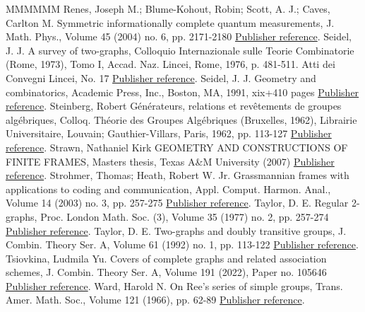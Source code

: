 \begin{thebibliography}{MMMMMM}
 Renes, Joseph M.; Blume-Kohout, Robin; Scott, A. J.; Caves, Carlton M. Symmetric informationally complete quantum measurements, J. Math. Phys., Volume 45 (2004) no. 6, pp. 2171-2180 \href{https://alco.centre-mersenne.org/articles/10.5802/alco.324/#RenesBlumeKohoutScottCaves:04}{Publisher reference}.
 Seidel, J. J. A survey of two-graphs, Colloquio Internazionale sulle Teorie Combinatorie (Rome, 1973), Tomo I, Accad. Naz. Lincei, Rome, 1976, p. 481-511. Atti dei Convegni Lincei, No. 17 \href{https://alco.centre-mersenne.org/articles/10.5802/alco.324/#Seidel:76}{Publisher reference}.
 Seidel, J. J. Geometry and combinatorics, Academic Press, Inc., Boston, MA, 1991, xix+410 pages \href{https://alco.centre-mersenne.org/articles/10.5802/alco.324/#Seidel:91}{Publisher reference}.
 Steinberg, Robert Générateurs, relations et revêtements de groupes algébriques, Colloq. Théorie des Groupes Algébriques (Bruxelles, 1962), Librairie Universitaire, Louvain; Gauthier-Villars, Paris, 1962, pp. 113-127 \href{https://alco.centre-mersenne.org/articles/10.5802/alco.324/#Steinberg:62}{Publisher reference}.
 Strawn, Nathaniel Kirk GEOMETRY AND CONSTRUCTIONS OF FINITE FRAMES, Masters thesis, Texas A\&M University (2007) \href{https://alco.centre-mersenne.org/articles/10.5802/alco.324/#Strawn:07}{Publisher reference}.
 Strohmer, Thomas; Heath, Robert W. Jr. Grassmannian frames with applications to coding and communication, Appl. Comput. Harmon. Anal., Volume 14 (2003) no. 3, pp. 257-275 \href{https://alco.centre-mersenne.org/articles/10.5802/alco.324/#StrohmerHeath:03}{Publisher reference}.
 Taylor, D. E. Regular 2-graphs, Proc. London Math. Soc. (3), Volume 35 (1977) no. 2, pp. 257-274 \href{https://alco.centre-mersenne.org/articles/10.5802/alco.324/#Taylor:77}{Publisher reference}.
 Taylor, D. E. Two-graphs and doubly transitive groups, J. Combin. Theory Ser. A, Volume 61 (1992) no. 1, pp. 113-122 \href{https://alco.centre-mersenne.org/articles/10.5802/alco.324/#Taylor:92}{Publisher reference}.
 Tsiovkina, Ludmila Yu. Covers of complete graphs and related association schemes, J. Combin. Theory Ser. A, Volume 191 (2022), Paper no. 105646 \href{https://alco.centre-mersenne.org/articles/10.5802/alco.324/#Tsiovkina:22}{Publisher reference}.
 Ward, Harold N. On Ree’s series of simple groups, Trans. Amer. Math. Soc., Volume 121 (1966), pp. 62-89 \href{https://alco.centre-mersenne.org/articles/10.5802/alco.324/#Ward:66}{Publisher reference}.

\end{thebibliography}
